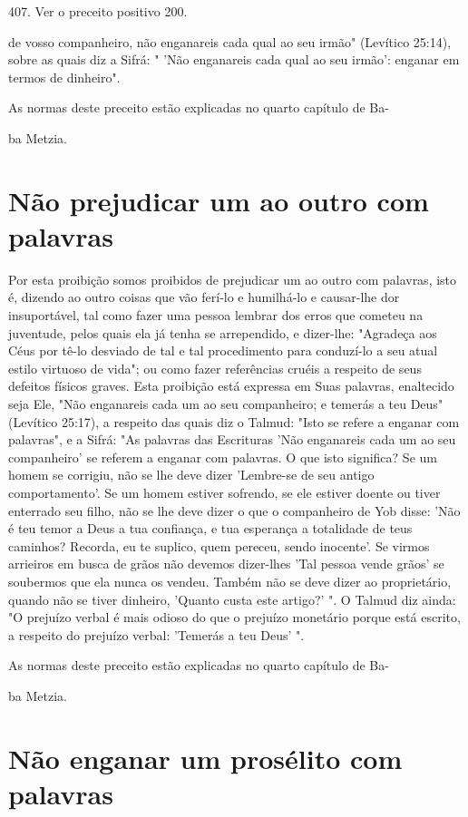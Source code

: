 407. Ver o preceito positivo 200.


de vosso companheiro, não enganareis cada qual ao seu irmão" (Levítico
25:14), sobre as quais diz a Sifrá: " 'Não enganareis cada qual ao seu
irmão': enganar em termos de dinheiro".


As normas deste preceito estão explicadas no quarto capítulo de Ba-


ba Metzia.

\section{Não prejudicar um ao outro com palavras}

Por esta proibição somos proibidos de prejudicar um ao outro com
palavras, isto é, dizendo ao outro coisas que vão ferí-lo e humilhá-lo e
causar-lhe dor insuportável, tal como fazer uma pessoa lembrar dos erros
que come­teu na juventude, pelos quais ela já tenha se arrependido, e
dizer-lhe: "Agrade­ça aos Céus por tê-lo desviado de tal e tal
procedimento para conduzí-lo a seu atual estilo virtuoso de vida"; ou
como fazer referências cruéis a respeito de seus defeitos físicos
graves. Esta proibição está expressa em Suas palavras, enal­tecido seja
Ele, "Não enganareis cada um ao seu companheiro; e temerás a teu Deus"
(Levítico 25:17), a respeito das quais diz o Talmud: "Isto se refere a
en­ganar com palavras", e a Sifrá: "As palavras das Escrituras 'Não
enganareis cada um ao seu companheiro' se referem a enganar com
palavras. O que isto signifi­ca? Se um homem se corrigiu, não se lhe
deve dizer 'Lembre-se de seu antigo comportamento'. Se um homem estiver
sofrendo, se ele estiver doente ou ti­ver enterrado seu filho, não se
lhe deve dizer o que o companheiro de Yob disse: 'Não é teu temor a Deus
a tua confiança, e tua esperança a totalidade de teus caminhos? Recorda,
eu te suplico, quem pereceu, sendo inocente'. Se vir­mos arrieiros em
busca de grãos não devemos dizer-lhes 'Tal pessoa vende grãos' se
soubermos que ela nunca os vendeu. Também não se deve dizer ao
proprie­tário, quando não se tiver dinheiro, 'Quanto custa este artigo?'
". O Talmud diz ainda: "O prejuízo verbal é mais odioso do que o
prejuízo monetário por­que está escrito, a respeito do prejuízo verbal:
'Temerás a teu Deus' ".


As normas deste preceito estão explicadas no quarto capítulo de Ba-


ba Metzia.

\section{Não enganar um prosélito com palavras}

